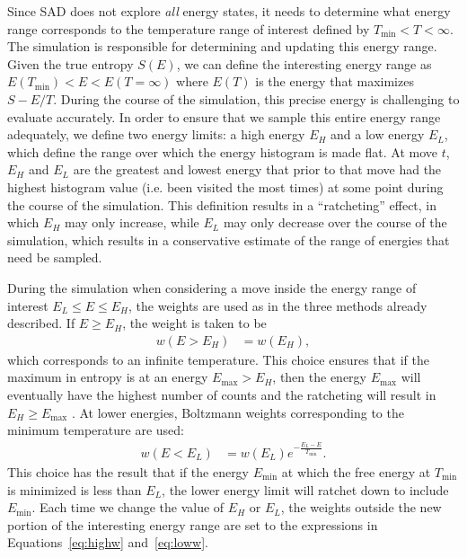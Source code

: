 \documentclass[letterpaper,twocolumn,amsmath,amssymb,pre,aps,10pt]{revtex4-1}
\begin{document}
Since SAD does not explore \emph{all} energy states, it needs to
determine what energy range corresponds to the temperature range of
interest defined by $T_{\min}<T<\infty$. The simulation is responsible
for determining and updating this energy range. Given the true entropy
$S(E)$, we can define the interesting energy range as
  $E(T_{\min}) <E< E(T=\infty)$
where $E(T)$ is the energy that maximizes $S-E/T$.  During the course of the
simulation, this precise energy is challenging to evaluate accurately.
In order to ensure that we sample this entire energy range adequately,
we define two energy limits:  a high energy $E_H$ and a low
energy $E_L$, which define the range over which the energy histogram
is made flat. At move $t$, $E_H$ and $E_L$ are the greatest and lowest
energy that prior to that move
had the highest histogram value (i.e. been visited the most times) at some point
during the course of the simulation.
This definition results in a ``ratcheting'' effect, in which $E_H$
may only increase, while $E_L$ may only decrease over the course of the
simulation, which results in a conservative estimate of the range of
energies that need be sampled.

During the simulation when considering a move inside the energy
range of interest $E_L \le E \le E_H$, the weights are used as in the
three methods already described.  If $E\ge E_H$, the weight is taken
to be
\begin{align}\label{eq:highw}
  w(E>E_H) &= w(E_H),
\end{align}
which corresponds to an infinite temperature.  This choice ensures
that if the maximum in entropy is at an energy $E_{\max}>E_H$, then
the energy $E_{\max}$ will eventually have the highest number of
counts and the ratcheting will result in $E_H\ge E_{\max}$ .  At lower
energies, Boltzmann weights corresponding to the minimum temperature
are used:
\begin{align}\label{eq:loww}
  w(E<E_L) &= w(E_L)e^{-\frac{E_L-E}{T_{\min}}}.
\end{align}
This choice has the result that if the energy $E_{\min}$ at which the free
energy at $T_{\min}$ is minimized is less than $E_L$, the lower energy
limit will ratchet down to include $E_{\min}$.
Each time we change the value of $E_H$ or $E_L$, the weights outside the
new portion of the interesting energy range are set to the expressions
in Equations~\ref{eq:highw} and~\ref{eq:loww}.
\end{document}
